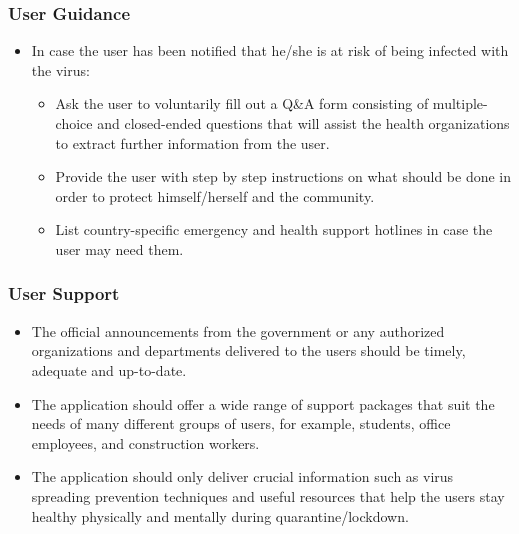       \subsubsection{User Guidance}
        \begin{itemize}
          \item In case the user has been notified that he/she is at risk of being infected with the virus:
            \begin{itemize}
              \item Ask the user to voluntarily fill out a Q&A form consisting of multiple-choice and closed-ended questions that will assist the health organizations to extract further information from the user.
              \item Provide the user with step by step instructions on what should be done in order to protect himself/herself and the community.
              \item List country-specific emergency and health support hotlines in case the user may need them.
            \end{itemize}
        \end{itemize}
    
      \subsubsection{User Support}
        \begin{itemize}
          \item The official announcements from the government or any authorized organizations and departments delivered to the users should be timely, adequate and up-to-date.
          \item The application should offer a wide range of support packages that suit the needs of many different groups of users, for example, students, office employees, and construction workers.
          \item The application should only deliver crucial information such as virus spreading prevention techniques and useful resources that help the users stay healthy physically and mentally during quarantine/lockdown.
        \end{itemize}
    
